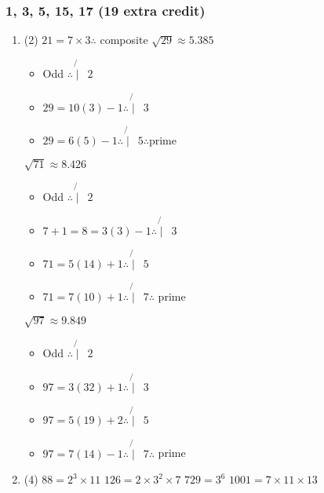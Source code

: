 \documentclass[12pt, A4]{article}
\begin{document}
			\subsubsection*{1, 3, 5, 15, 17 (19 extra credit)}
				\begin{enumerate}
					\item
						\begin{tasks}(2)
							\task
								\(21 = 7 \times 3 \therefore \) composite
							\task
								\(\sqrt{29} \approx 5.385\)
								\begin{itemize}[leftmargin = -0.25cm]
									\item Odd \(\therefore \not{\mid}\,\,\, 2\) 
									\item \(29 = 10(3) - 1 \therefore \not{\mid}\,\,\, 3\)
									\item \(29 = 6(5) - 1 \therefore \not{\mid}\,\,\, 5 \therefore \text{prime}\)
								\end{itemize}
							\task
								\(\sqrt{71} \approx 8.426\)
									\begin{itemize}[leftmargin = -0.25cm]
										\item Odd \(\therefore \not{\mid}\,\,\, 2\)
										\item \(7 + 1 = 8 = 3(3) - 1 \therefore \not{\mid}\,\,\, 3\)
										\item \(71 = 5(14) + 1 \therefore \not{\mid}\,\,\, 5\)
										\item  \(71 = 7(10) + 1 \therefore \not{\mid}\,\,\, 7 \therefore\) prime
									\end{itemize}
							\task
								\(\sqrt{97} \approx 9.849\)
									\begin{itemize}[leftmargin = -0.25cm]
										\item Odd \(\therefore \not{\mid}\,\,\, 2\)
										\item \(97 = 3(32) + 1 \therefore \not{\mid}\,\,\, 3\)
										\item \(97 = 5(19) + 2 \therefore \not{\mid}\,\,\, 5\)
										\item \(97 = 7(14) - 1 \therefore \not{\mid}\,\,\, 7 \therefore\) prime	
									\end{itemize}
						\end{tasks}
					\setcounter{enumi}{2}
					\item
						\begin{tasks}(4)
							\task
								\(88 = 2^3 \times 11\)
							\task
								\(126 = 2 \times 3^2 \times 7\)
							\task
								\(729 = 3^6\)
							\task
								\(1001 = 7 \times 11 \times 13\)

\end{tasks}
\end{enumerate}
\end{document}
